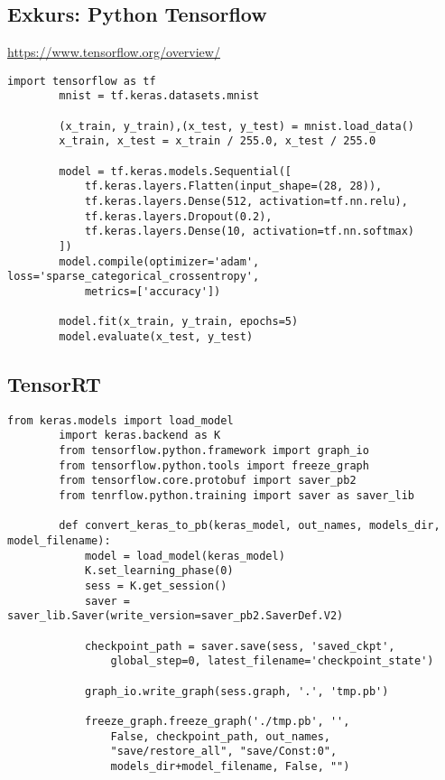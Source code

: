 		\subsection{Exkurs: Python Tensorflow}
		\autocite{tfDoc}
		
		\url{https://www.tensorflow.org/overview/}
		
		\autocite{kerasDoc}
		
		\begin{lstlisting}[caption=Keras/Tensorflow Beispiel]
		import tensorflow as tf
		mnist = tf.keras.datasets.mnist

		(x_train, y_train),(x_test, y_test) = mnist.load_data()
		x_train, x_test = x_train / 255.0, x_test / 255.0

		model = tf.keras.models.Sequential([
			tf.keras.layers.Flatten(input_shape=(28, 28)),
			tf.keras.layers.Dense(512, activation=tf.nn.relu),
			tf.keras.layers.Dropout(0.2),
			tf.keras.layers.Dense(10, activation=tf.nn.softmax)
		])
		model.compile(optimizer='adam', loss='sparse_categorical_crossentropy', 
			metrics=['accuracy'])

		model.fit(x_train, y_train, epochs=5)
		model.evaluate(x_test, y_test)
		\end{lstlisting}	
		
		\subsection{TensorRT}
		\autocite{trtDoc}
		
		\autocite{trtSmpl}
		
		\autocite{tftrtDoc}
		
		\begin{lstlisting}[caption=Tensorflow Modell einfrieren]
		from keras.models import load_model
		import keras.backend as K
		from tensorflow.python.framework import graph_io
		from tensorflow.python.tools import freeze_graph
		from tensorflow.core.protobuf import saver_pb2
		from tenrflow.python.training import saver as saver_lib

		def convert_keras_to_pb(keras_model, out_names, models_dir, model_filename):
			model = load_model(keras_model)
			K.set_learning_phase(0)
			sess = K.get_session()
			saver = saver_lib.Saver(write_version=saver_pb2.SaverDef.V2)
			
			checkpoint_path = saver.save(sess, 'saved_ckpt', 
				global_step=0, latest_filename='checkpoint_state')
				
			graph_io.write_graph(sess.graph, '.', 'tmp.pb')
			
			freeze_graph.freeze_graph('./tmp.pb', '',
				False, checkpoint_path, out_names,
				"save/restore_all", "save/Const:0",
				models_dir+model_filename, False, "")
		\end{lstlisting}
